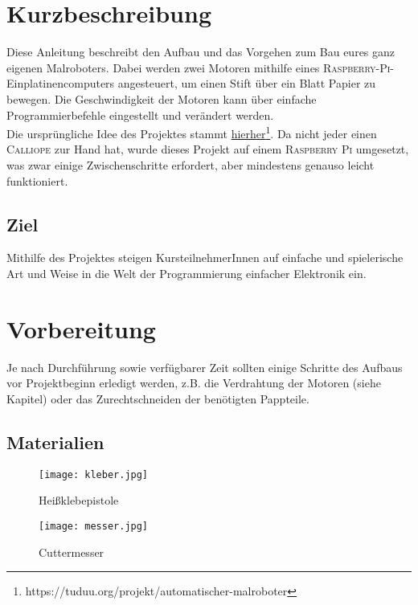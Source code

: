 \section{Kurzbeschreibung}
Diese Anleitung beschreibt den Aufbau und das Vorgehen zum Bau eures ganz eigenen Malroboters. 
Dabei werden zwei Motoren mithilfe eines \textsc{Raspberry-Pi}-Einplatinencomputers angesteuert, um einen Stift über ein Blatt Papier zu bewegen. Die Geschwindigkeit der Motoren kann über einfache Programmierbefehle eingestellt und verändert werden.\\

Die ursprüngliche Idee des Projektes stammt \href{https://tuduu.org/projekt/automatischer-malroboter}{hierher}\footnote[1]{https://tuduu.org/projekt/automatischer-malroboter}. Da nicht jeder einen \textsc{Calliope} zur Hand hat, wurde dieses Projekt auf einem \textsc{Raspberry Pi} umgesetzt, was zwar einige Zwischenschritte erfordert, aber mindestens genauso leicht funktioniert.\\

\subsection{Ziel}
Mithilfe des Projektes steigen KursteilnehmerInnen auf einfache und spielerische Art und Weise in die Welt der Programmierung einfacher Elektronik ein.\\

\section{Vorbereitung}
Je nach Durchführung sowie verfügbarer Zeit sollten einige Schritte des Aufbaus vor Projektbeginn erledigt werden, z.B. die Verdrahtung der Motoren (siehe Kapitel) oder das Zurechtschneiden der benötigten Pappteile.\\


\subsection{Materialien}

\begin{figure}[h]
\centering
\parbox{5cm}{
\texttt{[image: kleber.jpg]}
\caption*{Heißklebepistole}
}
\qquad
\begin{minipage}{5cm}
\texttt{[image: messer.jpg]}
\caption*{Cuttermesser}
\end{minipage}
\end{figure}

